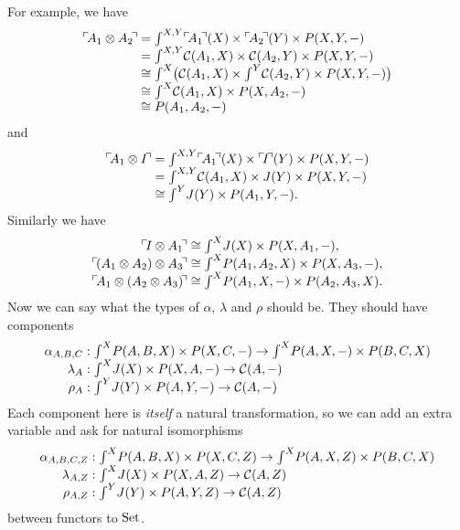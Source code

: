 \documentclass{robincs}
\newcommand\alfa[3]{\alpha_{#1,#2,#3}}
\let\origint = \int
\def\int{{\textstyle\origint}}
\newlength{\tw}\setlength{\tw}{\textwidth}\addtolength{\tw}{-\arrayrulewidth}
\begin{document}
For example, we have
\[\begin{array}{r@{\;}c@{\;}l}
        \qq{A_1\tn A_2} &=& \int^{X,Y} \qq{A_1}(X)\times\qq{A_2}(Y)\times P(X,Y,-)\\
                &=&     \int^{X,Y} \C(A_1,X)\times \C(A_2,Y)\times P(X,Y,-)\\
                &\cong& \int^{X} \bigl(\C(A_1,X)\times \int^Y \C(A_2,Y)\times P(X,Y,-)\bigr)\\
                &\cong& \int^{X} \C(A_1,X)\times P(X,A_2,-)\\
                &\cong& P(A_1,A_2,-)
\end{array}\]
and
\[\begin{array}{r@{\;}c@{\;}l}
        \qq{A_1\tn I} &=& \int^{X,Y} \qq{A_1}(X)\times\qq{I}(Y)\times P(X,Y,-)\\
                &=&     \int^{X,Y} \C(A_1,X)\times J(Y)\times P(X,Y,-)\\
                &\cong& \int^Y J(Y)\times P(A_1,Y,-).
\end{array}\]
Similarly we have
\[\begin{array}{r@{{}\protect\cong{}}l}
        \qq{I\tn A_1} & \int^X J(X)\times P(X,A_1,-),\\
        \qq{(A_1\tn A_2)\tn A_3} & \int^X P(A_1,A_2,X)\times P(X,A_3,-),\\
        \qq{A_1\tn (A_2\tn A_3)} & \int^X P(A_1,X,-)\times P(A_2,A_3,X).
\end{array}\]
%
Now we can say what the types of $\alpha$, $\lambda$ and $\rho$
should be. They should have components
\[\begin{array}{r@{\;}l}
        \alfa ABC:& \int^X P(A,B,X)\times P(X,C,-) \to \int^X P(A,X,-)\times P(B,C,X)\\
        \lambda_A:& \int^X J(X)\times P(X,A,-) \to \C(A,-)\\
        \rho_A:& \int^Y J(Y)\times P(A,Y,-) \to \C(A,-)
\end{array}\]
Each component here is \emph{itself} a natural transformation, so
we can add an extra variable and ask for natural isomorphisms
\[\begin{array}{r@{\;}l}
        \alpha_{A,B,C,Z}:& \int^X P(A,B,X)\times P(X,C,Z) \to \int^X P(A,X,Z)\times P(B,C,X)\\
        \lambda_{A,Z}:& \int^X J(X)\times P(X,A,Z) \to \C(A,Z)\\
        \rho_{A,Z}:& \int^Y J(Y)\times P(A,Y,Z) \to \C(A,Z)
\end{array}\]
between functors to $\mathrm{Set}$.
\end{document}
